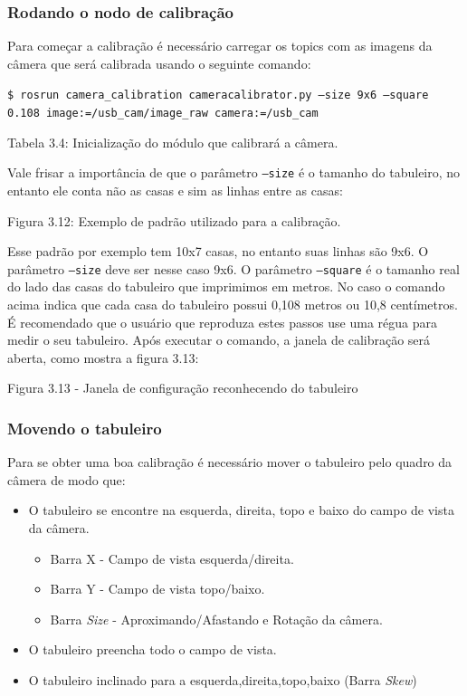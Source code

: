 \subsubsection{Rodando o nodo de calibração}

Para começar a calibração é necessário carregar os topics com as imagens da câmera que será calibrada usando o seguinte comando:

\texttt{\$ rosrun camera\_calibration cameracalibrator.py --size 9x6 --square 0.108 image:=/usb\_cam/image\_raw camera:=/usb\_cam}

Tabela 3.4: Inicialização do módulo que calibrará a câmera.

Vale frisar a importância de que o parâmetro \texttt{--size} é o tamanho do tabuleiro, no entanto ele conta não as casas e sim as linhas entre as casas:

Figura 3.12: Exemplo de padrão utilizado para a calibração.

Esse padrão por exemplo tem 10x7 casas, no entanto suas linhas são 9x6. O parâmetro \texttt{--size} deve ser nesse caso 9x6.
O parâmetro \texttt{--square} é o tamanho real do lado das casas do tabuleiro que imprimimos em metros. No caso o comando acima indica que cada casa do tabuleiro possui 0,108 metros ou 10,8 centímetros. É recomendado que o usuário que reproduza estes passos use uma régua para medir o seu tabuleiro.
Após executar o comando, a janela de calibração será aberta, como mostra a figura 3.13:

Figura 3.13 - Janela de configuração reconhecendo do tabuleiro

\subsubsection{Movendo o tabuleiro}

Para se obter uma boa calibração é necessário mover o tabuleiro pelo quadro da câmera de modo que:

\begin{itemize}
	\item{O tabuleiro se encontre na esquerda, direita, topo e baixo do campo de vista da câmera.}
	\begin{itemize}
		\item{Barra X - Campo de vista esquerda/direita.}
		\item{Barra Y - Campo de vista topo/baixo.}
		\item{Barra \textit{Size} - Aproximando/Afastando e Rotação da câmera.}
	\end{itemize}
	\item{O tabuleiro preencha todo o campo de vista.}
	\item{O tabuleiro inclinado para a esquerda,direita,topo,baixo (Barra \textit{Skew})}
\end{itemize}

